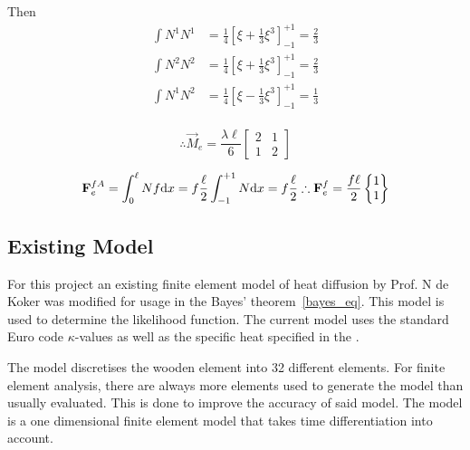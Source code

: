 Then
	\begin{equation}
	\begin{aligned}
	\int N^1 N^1 &= \frac{1}{4} \left[ \xi + \frac{1}{3}\xi^3 \right]_{-1}^{+1} = \frac{2}{3} \\
	\int N^2 N^2 &= \frac{1}{4} \left[ \xi + \frac{1}{3}\xi^3 \right]_{-1}^{+1} = \frac{2}{3} \\
	\int N^1 N^2 &= \frac{1}{4} \left[ \xi - \frac{1}{3}\xi^3 \right]_{-1}^{+1} = \frac{1}{3} \\
	\end{aligned}
	\end{equation}	
	
	\begin{equation}
	\therefore \vec{M}_e = \frac{\lambda \ell}{6} \begin{bmatrix} 2 & 1 \\ 1 & 2 \end{bmatrix}
	\end{equation}
	
	\begin{equation}
	\vec{F}_e^{fA} = \int_0^\ell N f \text{d}x = f \frac{\ell}{2} \int_{-1}^{+1} N \text{d}x = f\frac{\ell}{2} \\
\therefore \vec{F}_e^f = \frac{f\ell}{2} \begin{Bmatrix} 1\\1 \end{Bmatrix}
	\end{equation}
	\subsection{Existing Model}
	For this project an existing finite element model of heat diffusion by Prof. N de Koker was modified for usage in the Bayes' theorem~\ref{bayes_eq}. 
	This model is used to determine the likelihood function. 
	The current model uses the standard Euro code $\kappa$-values as well as the specific heat specified in the \citep{Euro:2004}. 
	
	The model discretises the wooden element into 32 different elements. For finite element analysis, there are always more elements used to generate the model than usually evaluated. This is done to improve the accuracy of said model.
	The model is a one dimensional finite element model that takes time differentiation into account.
	
